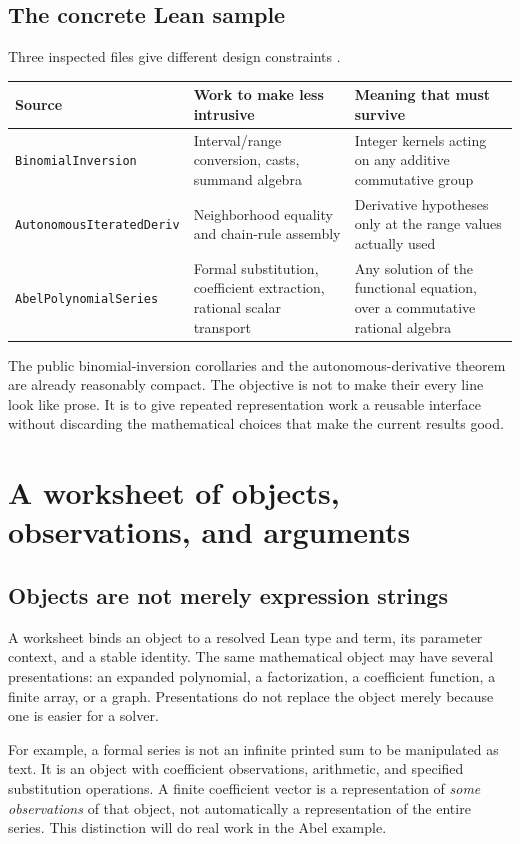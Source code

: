 \documentclass[11pt,a4paper]{article}
\newcommand{\code}[1]{\nolinkurl{#1}}
\theoremstyle{definition}
\begin{document}
\subsection{The concrete Lean sample}
Three inspected files give different design constraints \cite{p-binomial,p-ode,p-abel}.
\begin{center}
\begin{tabularx}{\textwidth}{@{}P{.28\textwidth}YY@{}}
\toprule
Source & Work to make less intrusive & Meaning that must survive \\
\midrule
\code{BinomialInversion} & Interval/range conversion, casts, summand algebra & Integer kernels acting on any additive commutative group \\
\code{AutonomousIteratedDeriv} & Neighborhood equality and chain-rule assembly & Derivative hypotheses only at the range values actually used \\
\code{AbelPolynomialSeries} & Formal substitution, coefficient extraction, rational scalar transport & Any solution of the functional equation, over a commutative rational algebra \\
\bottomrule
\end{tabularx}
\end{center}
The public binomial-inversion corollaries and the autonomous-derivative theorem
are already reasonably compact. The objective is not to make their every line
look like prose. It is to give repeated representation work a reusable interface
without discarding the mathematical choices that make the current results good.

\section{A worksheet of objects, observations, and arguments}
\label{sec:workspace}
\subsection{Objects are not merely expression strings}
A worksheet binds an object to a resolved Lean type and term, its parameter
context, and a stable identity. The same mathematical object may have several
presentations: an expanded polynomial, a factorization, a coefficient function,
a finite array, or a graph. Presentations do not replace the object merely
because one is easier for a solver.

For example, a formal series is not an infinite printed sum to be manipulated
as text. It is an object with coefficient observations, arithmetic, and specified
substitution operations. A finite coefficient vector is a representation of
\emph{some observations} of that object, not automatically a representation of
the entire series. This distinction will do real work in the Abel example.
\end{document}
